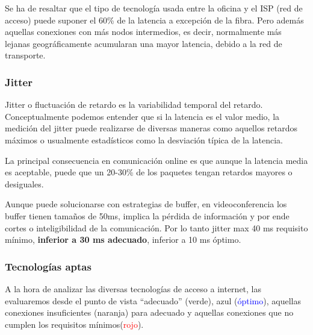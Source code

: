 Se ha de resaltar que el tipo de tecnología usada entre la oficina y el ISP (red de acceso) puede suponer el 60\% de la latencia a excepción de la fibra. Pero además aquellas conexiones con más nodos intermedios, es decir, normalmente más lejanas geográficamente acumularan una mayor latencia, debido a la red de transporte. 

\subsubsection{Jitter}
Jitter o fluctuación de retardo es la variabilidad temporal del retardo. Conceptualmente podemos entender que si la latencia es el valor medio, la medición del jitter puede realizarse de diversas maneras como aquellos retardos máximos o usualmente estadísticos como la desviación típica de la latencia.

La principal consecuencia en comunicación online es que aunque la latencia media es aceptable, puede que un 20-30\% de los paquetes tengan retardos mayores o desiguales.

Aunque puede solucionarse con estrategias de buffer, en videoconferencia los buffer tienen tamaños de 50ms, implica la pérdida de información y por ende cortes o inteligibilidad de la comunicación. Por lo tanto jitter max 40 ms requisito mínimo, \textbf{inferior a 30 ms adecuado}, inferior a 10 ms óptimo.

\subsubsection{Tecnologías aptas}
A la hora de analizar las diversas tecnologías de acceso a internet, las evaluaremos desde el punto de vista “adecuado” (\textcolor[cmyk]{1,0,1,0}{verde}), azul (\textcolor{blue}{óptimo}), aquellas conexiones insuficientes (\textcolor{naranja}{naranja}) para adecuado y aquellas conexiones que no cumplen los requisitos mínimos(\textcolor{red}{rojo}). 

